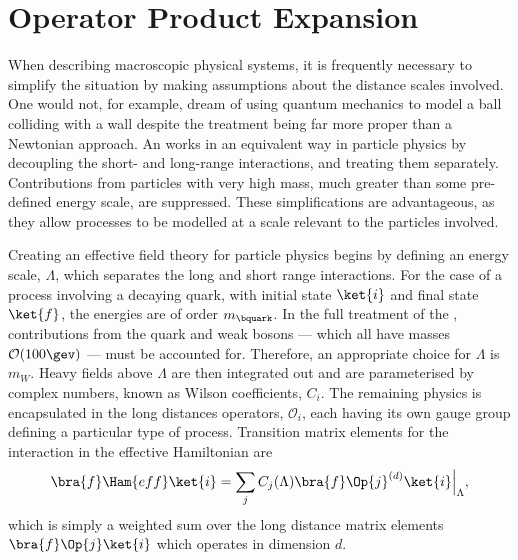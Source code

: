 \section{Operator Product Expansion}

When describing macroscopic physical systems, it is frequently necessary to simplify the situation
by making assumptions about the distance scales involved.
One would not, for example, dream of using quantum mechanics to model a ball colliding with a wall
despite the treatment being far more proper than a Newtonian approach.
An \EFT works in an equivalent way in particle physics
by decoupling the short- and long-range interactions, and treating them separately.
Contributions from particles with very high mass, much greater than some pre-defined energy scale,
are suppressed.
These simplifications are advantageous, as they allow processes to be modelled at a scale
relevant to the particles involved.

Creating an effective field theory for particle physics begins by defining an energy scale,
$\Lambda$, which separates the long and short range interactions.
For the case of a process involving a decaying \bquark quark, with initial state $\ket{i}$ and
final state $\ket{f}$,
the energies are of order $m_\bquark$.
In the full treatment of the \sm, contributions from the \tquark quark and weak bosons --- which all
have masses $\mathcal{O}(100\gev)$ --- must be accounted for.
Therefore, an appropriate choice for $\Lambda$ is \approx$m_W$.
Heavy fields above $\Lambda$ are then integrated out and are parameterised by complex numbers,
known as Wilson coefficients, $C_i$.
The remaining physics is encapsulated in the long distances operators, $\mathcal{O}_i$, each having
its own gauge group defining a particular type of process.
Transition matrix elements for the interaction in the effective Hamiltonian are
\begin{equation}
  \bra{f}\Ham{eff}\ket{i} =
  \sum_j C_j(\Lambda)\bra{f}\Op{j}^{(d)}\ket{i}\Big|_{\Lambda},
  \label{eq:th:opeham}
\end{equation}
which is simply a weighted sum over the long distance matrix elements $\bra{f}\Op{j}\ket{i}$ which
operates in dimension $d$.

